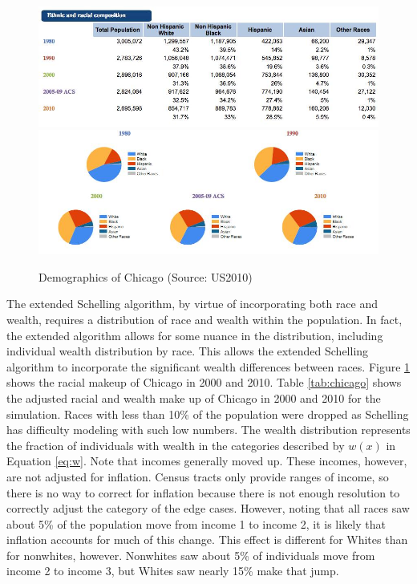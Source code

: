 \documentclass[11pt]{asaproc}
\newcommand{\1}{\mathbb{1}}
\begin{document}
\begin{figure}[h!]
\centering
\includegraphics[scale=0.45]{figures/chart4.png}
\includegraphics[scale=0.4]{figures/chart3.png}
\caption[Demographics of Chicago]{Demographics of Chicago (Source: US2010)\citep{brown10}}
\label{tab:chicago2}
\end{figure}


The extended Schelling algorithm, by virtue of incorporating both race and wealth, requires a distribution of race and wealth within the population. In fact, the extended algorithm allows for some nuance in the distribution, including individual wealth distribution by race. This allows the extended Schelling algorithm to incorporate the significant wealth differences between races. Figure \ref{tab:chicago2} shows the racial makeup of Chicago in 2000 and 2010. Table \ref{tab:chicago} shows the adjusted racial and wealth make up of Chicago in 2000 and 2010 for the simulation. Races with less than 10\% of the population were dropped as Schelling has difficulty modeling with such low numbers. The wealth distribution represents the fraction of individuals with wealth in the categories described by $w(x)$ in Equation \ref{eq:w}. Note that incomes generally moved up. These incomes, however, are not adjusted for inflation. Census tracts only provide ranges of income, so there is no way to correct for inflation because there is not enough resolution to correctly adjust the category of the edge cases. However, noting that all races saw about 5\% of the population move from income 1 to income 2, it is likely that inflation accounts for much of this change. This effect is different for Whites than for nonwhites, however. Nonwhites saw about 5\% of individuals move from income 2 to income 3, but Whites saw nearly 15\% make that jump.
\end{document}
